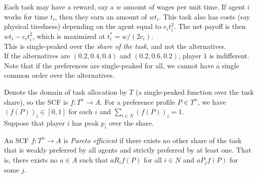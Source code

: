 		\begin{fex}
			Each task may have a reward, say a $w$ amount of wages per unit time. If agent $i$ works for time $t_i$, then they earn an amount of $wt_i$. This task also has costs (say physical tiredness) depending on the agent equal to $c_it_i^2$. The net payoff is then $wt_i - c_it_i^2$, which is maximized at $t_i^* = w/(2c_i)$.\\
			This is single-peaked over the \emph{share of the task}, and not the alternatives. \\
			If the alternatives are $(0.2,0.4,0.4)$ and $(0.2,0.6,0.2)$, player $1$ is indifferent. Note that if the preferences are single-peaked for all, we cannot have a single common order over the alternatives.
		\end{fex}

		Denote the domain of task allocation by $T$ (a single-peaked function over the task share), so the SCF is $f : T^n \to A$. For a preference profile $P \in T^n$, we have $(f(P))_i \in [0,1]$ for each $i$ and $\sum_{i \in N} (f(P))_i = 1$.\\
		Suppose that player $i$ has peak $p_i$ over the share.

		\begin{fdef}
			An SCF $f : T^n \to A$ is \emph{Pareto efficient} if there exists no other share of the task that is weakly preferred by all agents and strictly preferred by at least one. That is, there exists no $a \in A$ such that $a R_i f(P)$ for all $i \in N$ and $a P_j f(P)$ for some $j$.
		\end{fdef}

